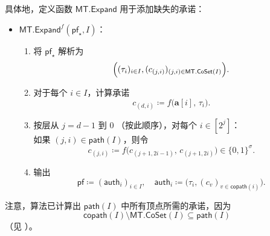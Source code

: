 \documentclass[american,singlepageview]{snargs-book-zh}
\newcommand{\Bits}{\{0,1\}}
\newcommand{\DefineEqual}{\coloneqq}
\newcommand{\ProtoSalt}{\tau}
\newcommand{\ROFunction}{f}
\newcommand{\ROOutputSize}{\sigma}
\newcommand{\MTGraphVertex}{v}
\newcommand{\MTDepth}{d}
\newcommand{\MTPath}{\mathsf{path}}
\newcommand{\MTCoPath}{\mathsf{copath}}
\newcommand{\MTLayer}{j}
\newcommand{\MTSymbol}{\mathsf{MT}}
\newcommand{\MTVertexLabel}{c}
\newcommand{\MTVertexLabelByName}[2]{\MTVertexLabel_{(#1,#2)}}
\newcommand{\MTAuthPath}{\mathsf{auth}}
\newcommand{\MTProof}{\mathsf{pf}}
\newcommand{\MTMessageIndex}{i}
\newcommand{\MTMessageIndexSet}{I}
\newcommand{\MTMessageSubVector}{\mathbf{a}}
\newcommand{\MTSaltString}{\ProtoSalt}
\newcommand{\MTDeriveVertexSet}{\MTSymbol.\mathsf{CoSet}}
\newcommand{\MTExpandOpening}{\MTSymbol.\mathsf{Expand}}
\begin{document}
\begin{itemize}
  具体地，定义函数 $\MTExpandOpening$ 用于添加缺失的承诺：
  \begin{itemize}
    \item[] $\MTExpandOpening^{\ROFunction}(\MTProof_{\star},\MTMessageIndexSet)$：
    \begin{enumerate}[nolistsep]
      \item 将 $\MTProof_{\star}$ 解析为
      \[
        \Bigl(
          (\MTSaltString_{\MTMessageIndex})_{\MTMessageIndex\in\MTMessageIndexSet},
          (\MTVertexLabelByName{\MTLayer}{\MTMessageIndex})_{(\MTLayer,\MTMessageIndex)\in\MTDeriveVertexSet(\MTMessageIndexSet)}
        \Bigr).
      \]
      \item 对于每个 $\MTMessageIndex\in\MTMessageIndexSet$，计算承诺
      \[
        \MTVertexLabelByName{\MTDepth}{\MTMessageIndex}
        \DefineEqual
        \ROFunction\bigl(\MTMessageSubVector[\MTMessageIndex],\,\MTSaltString_{\MTMessageIndex}\bigr).
      \]
      \item 按层从 $\MTLayer=\MTDepth-1$ 到 $0$ （按此顺序），对每个 $\MTMessageIndex\in[2^{\MTLayer}]$：\\
        如果 $(\MTLayer,\MTMessageIndex)\in\MTPath(\MTMessageIndexSet)$，则令
        \[
          \MTVertexLabelByName{\MTLayer}{\MTMessageIndex}
          \DefineEqual
          \ROFunction\bigl(\MTVertexLabelByName{\MTLayer+1}{2\MTMessageIndex-1},\,\MTVertexLabelByName{\MTLayer+1}{2\MTMessageIndex}\bigr)
          \in\Bits^{\ROOutputSize}.
        \]
      \item 输出
      \[
        \MTProof \DefineEqual (\MTAuthPath_{\MTMessageIndex})_{\MTMessageIndex\in\MTMessageIndexSet},
        \quad
        \MTAuthPath_{\MTMessageIndex}\DefineEqual\bigl(\MTSaltString_{\MTMessageIndex},(\MTVertexLabel_{\MTGraphVertex})_{\MTGraphVertex\in\MTCoPath(\MTMessageIndex)}\bigr).
      \]
    \end{enumerate}
  \end{itemize}
  注意，算法已计算出 $\MTPath(\MTMessageIndexSet)$ 中所有顶点所需的承诺，因为
  \[
    \MTCoPath(\MTMessageIndexSet)\setminus\MTDeriveVertexSet(\MTMessageIndexSet)
    \subseteq
    \MTPath(\MTMessageIndexSet)
  \]
  （见 ）。


\end{itemize}
\end{document}
